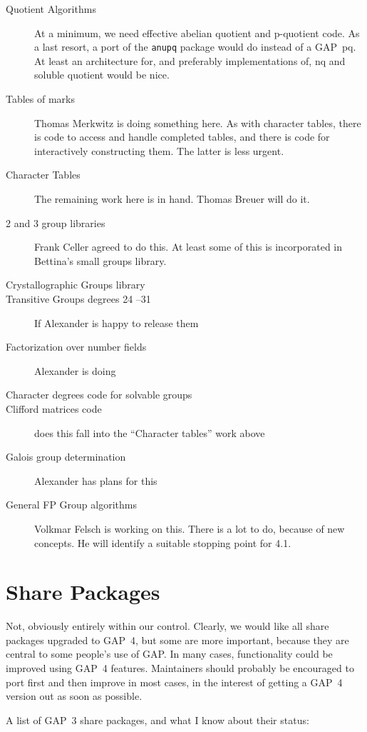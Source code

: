 \documentclass[12pt]{article}
\newcommand{\GAP}{\textsf{GAP}}
\newcommand{\bd}{\begin{description}}
\newcommand{\ed}{\end{description}}
\begin{document}
\bd
\item[Quotient Algorithms] At a minimum, we need effective abelian
quotient and p-quotient code. As a last resort, a port of the
\texttt{anupq} package would do instead of a \GAP\ pq. At least an
architecture for, and preferably implementations of, nq and soluble
quotient would be nice.
\item[Tables of marks] Thomas Merkwitz is doing something here. As
with character tables, there is code to access and handle completed
tables, and there is code for interactively constructing them. The
latter is less urgent.
\item[Character Tables] The remaining work here is in hand. Thomas
Breuer will do it.
\item[2 and 3 group libraries] Frank Celler agreed to do this. At
least some of this is incorporated in Bettina's small groups library.
\item[Crystallographic Groups library] 
\item[Transitive Groups degrees 24 --31] If Alexander is happy to
release them
\item[Factorization over number fields] Alexander is doing
\item[Character degrees code for solvable groups] 
\item[Clifford matrices code] does this fall into the ``Character
tables'' work above
\item[Galois group determination] Alexander has plans for this
\item[General FP Group algorithms] Volkmar Felsch is working on
this. There is a lot to do, because of new concepts.
He will identify a suitable stopping point for 4.1.
\ed

\section{Share Packages}

Not, obviously entirely within our control. Clearly, we would like all
share packages upgraded to \GAP\ 4, but some are more important,
because they are central to some people's use of \GAP. In many cases,
functionality could be improved using \GAP\ 4 features. Maintainers
should probably be encouraged to port first and then improve in most
cases, in the interest of getting a \GAP\ 4 version out as soon as possible.

A list of \GAP\ 3 share packages, and what I know about their status:
\end{document}
